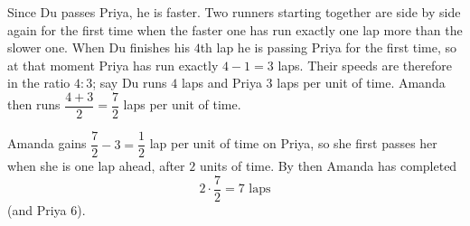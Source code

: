 Since Du passes Priya, he is faster. Two runners starting together are side by side again for the first time when the faster one has run exactly one lap more than the slower one. When Du finishes his $4$th lap he is passing Priya for the first time, so at that moment Priya has run exactly $4-1=3$ laps. Their speeds are therefore in the ratio $4:3$; say Du runs $4$ laps and Priya $3$ laps per unit of time. Amanda then runs $\dfrac{4+3}{2}=\dfrac{7}{2}$ laps per unit of time.

Amanda gains $\dfrac{7}{2}-3=\dfrac{1}{2}$ lap per unit of time on Priya, so she first passes her when she is one lap ahead, after $2$ units of time. By then Amanda has completed
\[
2\cdot\dfrac{7}{2}=\boxed{7}\text{ laps}
\]
(and Priya $6$).
